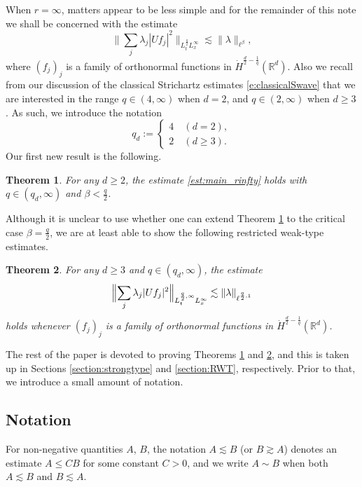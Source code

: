 \documentclass[a4paper]{amsart}
\numberwithin{equation}{section}%
\theoremstyle{plain}%
\newtheorem{theorem}{Theorem}[section]
\theoremstyle{definition}
\theoremstyle{remark}%
\begin{document}
When $r = \infty$, matters appear to be less simple and for the remainder of this note we shall be concerned with the estimate
\begin{equation}
\label{est:main_rinfty}
\bigg\| \sum_j \lambda_j |Uf_j|^2 \bigg\|_{L^{\frac{q}{2}}_t L^{\infty}_x} \lesssim \| \lambda \|_{\ell^\beta}, 
\end{equation}
where $(f_j)_j$ is a family of orthonormal functions in $\dot{H}^{\frac{d}{2}-\frac{1}{q}}(\mathbb{R}^d)$. Also we recall from our discussion of the classical Strichartz estimates \eqref{e:classicalSwave} that we are interested in the range $q \in (4,\infty)$ when $d = 2$, and $q \in (2,\infty)$ when $d \geq 3$. As such, we introduce the notation
\[
q_d := \begin{cases}
4 \ & (d=2),\\
2 & (d \geq 3).
\end{cases}
\]
Our first new result is the following.
\begin{theorem} \label{thm:main_strong}
For any $d \geq 2$, the estimate \eqref{est:main_rinfty} holds with $q \in (q_d,\infty)$ and $\beta < \frac{q}{2}$.
\end{theorem}
Although it is unclear to use whether one can extend Theorem \ref{thm:main_strong} to the critical case $\beta = \frac{q}{2}$, we are at least able to show the following restricted weak-type estimates.
\begin{theorem}
\label{thm:WRest}
For any $d\geq 3$ and $q \in (q_d,\infty)$, the estimate
\begin{equation}\label{i:weak-restricted}
\Bigl\|\sum_j\lambda_j|U f_j|^2\Bigr\|_{L_t^{\frac q2,\infty}L_x^\infty}
\lesssim 
\|\lambda\|_{\ell^{\frac q2,1}}
\end{equation}
holds whenever $(f_j)_j$ is a family of orthonormal functions in $\dot{H}^{\frac{d}{2}-\frac{1}{q}}(\mathbb{R}^d)$.
\end{theorem}

The rest of the paper is devoted to proving Theorems \ref{thm:main_strong} and \ref{thm:WRest}, and this is taken up in Sections \ref{section:strongtype} and \ref{section:RWT}, respectively. Prior to that, we introduce a small amount of notation.


\subsection*{Notation}

For non-negative quantities $A$, $B$, the notation $A\lesssim B$ (or $B \gtrsim A$) denotes an estimate $A \leq CB$ for some constant $C > 0$, and we write $A \sim B$ when both $A \lesssim B$ and $B\lesssim A$.
\end{document}
